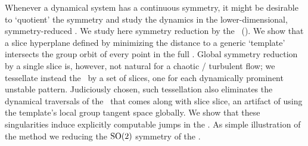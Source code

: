 
Whenever a dynamical system has a continuous symmetry, it might be
desirable to `quotient' the symmetry and study the dynamics in the
lower-dimensional, symmetry-reduced \statesp. We study here symmetry
reduction by the \mslices\ (\mframes). We show that a slice hyperplane
defined by minimizing the distance to a generic `template' intersects the
group orbit of every point in the full {\statesp}. Global symmetry
reduction by a single slice is, however, not natural for a chaotic /
turbulent flow; we tessellate instead the \reducedsp\ by a set of slices,
one for each dynamically prominent unstable pattern. Judiciously chosen,
such tessellation also eliminates the dynamical traversals of the \sset\
that comes along with slice slice, an artifact of using the template's
local group tangent space globally. We show that these singularities
induce explicitly computable jumps in the \reducedsp. As simple
illustration of the method we reducing the $\textrm{SO}(2)$ symmetry of the
\cLe.

%
